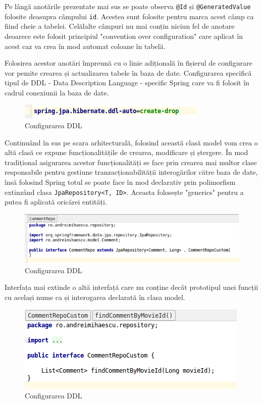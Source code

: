 \documentclass[12pt, a4paper, oneside, romanian]{teza-upb}
\begin{document}
Pe lângă anotările prezentate mai sus se poate observa \texttt{@Id} și \texttt{@GeneratedValue} folosite deasupra câmpului \texttt{id}. Acestea sunt folosite pentru marca acest câmp ca fiind cheie a tabelei. Celălalte câmpuri nu mai conțin niciun fel de anotare deoarece este folosit principiul "convention over configuration" care aplicat în acest caz va crea în mod automat coloane în tabelă. 

Folosirea acestor anotări împreună cu o linie adițională în fișierul de configurare vor pemite crearea și actualizarea tabele în baza de date. Configurarea specifică tipul de DDL - Data Description Language - specific Spring care va fi folosit în cadrul conexiunii la baza de date.

\begin{figure}[ht]
\centering
\includegraphics[scale=0.6]{img/spring-boot-ddl-auto.png}
\caption{Configurarea DDL}
\label{fig:arhi_componente}
\end{figure}

Continuând în sus pe scara arhitecturală, folosind această clasă model vom crea o altă clasă ce expune funcționalitățile de crearea, modificare și ștergere. În mod tradițional asigurarea acestor funcționalități se face prin crearea mai multor clase responsabile pentru gestiune tranzacționabilității interogărilor către baza de date, însă folosind Spring totul se poate face în mod declarativ prin polimorfism extinzând clasa \texttt{JpaRepository<T, ID>}. Aceasta folosește "generics" pentru a putea fi aplicată oricărei entități.

\begin{figure}[ht]
\centering
\includegraphics[scale=0.6]{img/spring-boot-jpa-repository.png}
\caption{Configurarea DDL}
\label{fig:arhi_componente}
\end{figure}

Interfața mai extinde o altă interfață care nu conține decât prototipul unei funcții cu același nume ca și interogarea declarată în clasa model.

\begin{figure}[ht]
\centering
\includegraphics[scale=0.6]{img/spring-boot-repo-custom.png}
\caption{Configurarea DDL}
\label{fig:arhi_componente}
\end{figure}
\end{document}
